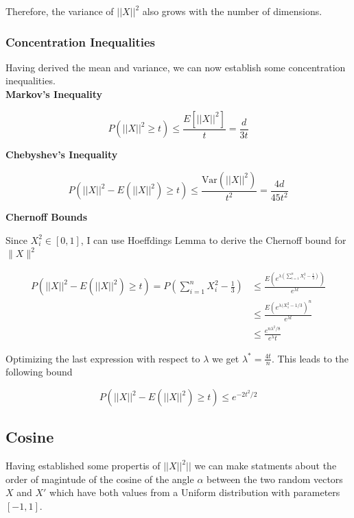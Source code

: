 \documentclass[a4paper, 11pt]{article} %
\begin{document}
Therefore, the variance of $||X||^2$ also grows with the number of dimensions. 

\subsubsection{Concentration Inequalities}

Having derived the mean and variance, we can now establish some concentration inequalities.\\

\textbf{Markov's Inequality}

\begin{equation*}
P(||X||^2 \geq t) \leq \frac{E \left[||X||^2 \right]}{t} = \frac{d}{3t}
\end{equation*}


\textbf{Chebyshev's Inequality}

\begin{equation*}
P(||X||^2 - E\left(||X||^2 \right) \geq t) \leq \frac{\text{Var}(||X||^2)}{t^2} = \frac{4d}{45t^2}
\end{equation*}

\newpage

\textbf{Chernoff Bounds}

Since $X_i^2 \in [0,1]$, I can use Hoeffdings Lemma to derive the Chernoff bound for $\|X \|^2$


\begin{align*}
P(||X||^2 - E\left(||X||^2 \right) \geq t) = P \left( \sum_{i=1}^n X_{i}^2 - \frac{1}{3} \right)  &\leq \frac{E\left(e^{ \lambda( \sum_{i=1}^n X_{i}^2 -  \frac{1}{3} )} \right)}{e^{\lambda t} } \\
 	&\leq \frac{E \left( e^{ \lambda (X_1^2 -1/3} \right)^n}{e^{\lambda t }} \\
 	&\leq \frac{e ^{n\lambda^2 / 8}}{e^\lambda t} 
\end{align*}

Optimizing the last expression with respect to $\lambda$ we get $\lambda^* = \frac{4t}{n}$. This leads to the following bound

\begin{equation*}
P(||X||^2 - E\left(||X||^2 \right) \geq t) \leq e^{-2t^2 / 2} 
\end{equation*}

\subsection{Cosine}

Having established some propertis of $||X||^2||$ we can make statments about the order of magintude of the cosine of the angle $\alpha$ between the two random vectors $X$ and $X'$ which have both values from a Uniform distribution with parameters $[-1,1]$. 
\end{document}
